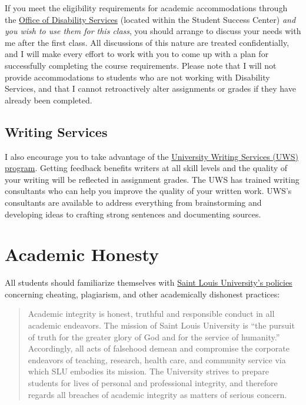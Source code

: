 \documentclass[]{book}
\theoremstyle{definition}
\theoremstyle{definition}
\theoremstyle{definition}
\theoremstyle{remark}
\begin{document}
If you meet the eligibility requirements for academic accommodations
through the
\href{https://www.slu.edu/life-at-slu/student-success-center/disability-services/index.php}{Office
of Disability Services} (located within the Student Success Center)
\emph{and you wish to use them for this class}, you should arrange to
discuss your needs with me after the first class. All discussions of
this nature are treated confidentially, and I will make every effort to
work with you to come up with a plan for successfully completing the
course requirements. Please note that I will not provide accommodations
to students who are not working with Disability Services, and that I
cannot retroactively alter assignments or grades if they have already
been completed.

\hypertarget{writing-services}{%
\subsection{Writing Services}\label{writing-services}}

I also encourage you to take advantage of the
\href{https://www.slu.edu/life-at-slu/student-success-center/academic-support/university-writing-services/index.php}{University
Writing Services (UWS) program}. Getting feedback benefits writers at
all skill levels and the quality of your writing will be reflected in
assignment grades. The UWS has trained writing consultants who can help
you improve the quality of your written work. UWS's consultants are
available to address everything from brainstorming and developing ideas
to crafting strong sentences and documenting sources.

\hypertarget{academic-honesty}{%
\section{Academic Honesty}\label{academic-honesty}}

All students should familiarize themselves with
\href{http://www.slu.edu/Documents/provost/academic_affairs/Academic\%20Integrity\%20Policy\%20FINAL\%20\%206-26-15.pd}{Saint
Louis University's policies} concerning cheating, plagiarism, and other
academically dishonest practices:

\begin{quote}
Academic integrity is honest, truthful and responsible conduct in all
academic endeavors. The mission of Saint Louis University is ``the
pursuit of truth for the greater glory of God and for the service of
humanity.'' Accordingly, all acts of falsehood demean and compromise the
corporate endeavors of teaching, research, health care, and community
service via which SLU embodies its mission. The University strives to
prepare students for lives of personal and professional integrity, and
therefore regards all breaches of academic integrity as matters of
serious concern.
\end{quote}
\end{document}
